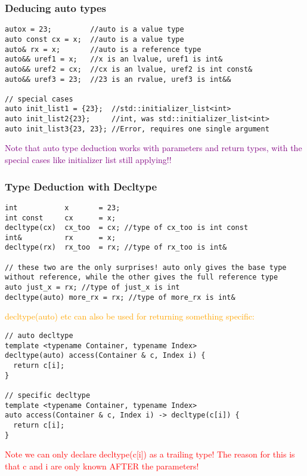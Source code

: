 \documentclass[main.tex,fontsize=8pt,paper=a4,paper=portrait,DIV=calc,]{scrartcl}
\begin{document}
\subsubsection{Deducing auto types}
\begin{lstlisting}
autox = 23;         //auto is a value type
auto const cx = x;  //auto is a value type
auto& rx = x;       //auto is a reference type
auto&& uref1 = x;   //x is an lvalue, uref1 is int&
auto&& uref2 = cx;  //cx is an lvalue, uref2 is int const&
auto&& uref3 = 23;  //23 is an rvalue, uref3 is int&&

// special cases
auto init_list1 = {23};  //std::initializer_list<int>
auto init_list2{23};     //int, was std::initializer_list<int>
auto init_list3{23, 23}; //Error, requires one single argument
\end{lstlisting}
\textcolor{purple}{Note that auto type deduction works with parameters and return types, with the special cases like initializer list still applying!!}

\subsubsection{Type Deduction with Decltype}
\begin{lstlisting}
int           x       = 23;
int const     cx      = x;
decltype(cx)  cx_too  = cx; //type of cx_too is int const
int&          rx      = x;
decltype(rx)  rx_too  = rx; //type of rx_too is int&

// these two are the only surprises! auto only gives the base type without reference, while the other gives the full reference type
auto just_x = rx; //type of just_x is int
decltype(auto) more_rx = rx; //type of more_rx is int&
\end{lstlisting}
\textcolor{orange}{decltype(auto) etc can also be used for returning something specific:} 
\begin{lstlisting}
// auto decltype
template <typename Container, typename Index>
decltype(auto) access(Container & c, Index i) {
  return c[i];
}

// specific decltype
template <typename Container, typename Index>
auto access(Container & c, Index i) -> decltype(c[i]) {
  return c[i];
}
\end{lstlisting}
\textcolor{red}{Note we can only declare decltype(c[i]) as a trailing type! The reason for this is that c and i are only known AFTER the parameters!}
\end{document}
